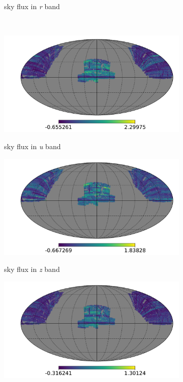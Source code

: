 \begin{figure}
\begin{subfigure}{.33\textwidth}
\label{fig:systmap9}
    \caption{sky flux in \textit{r} band}
\end{subfigure}
\\
\begin{subfigure}{.33\textwidth}
  \centering
\includegraphics[scale=0.214]{SystematicMaps2/map_sdss_dr12_systematics_skyfluxu.pdf}
\label{fig:systmap10}
    \caption{sky flux in \textit{u} band}
\end{subfigure}
\begin{subfigure}{.33\textwidth}
  \centering
\includegraphics[scale=0.214]{SystematicMaps2/map_sdss_dr12_systematics_skyfluxz.pdf}
\label{fig:systmap11}
    \caption{sky flux in \textit{z} band}
\end{subfigure}
\begin{subfigure}{.33\textwidth}
  \centering
\includegraphics[scale=0.214]{SystematicMaps2/map_sdss_dr12_systematics_skysigmag.pdf}

\end{subfigure}
\end{figure}
